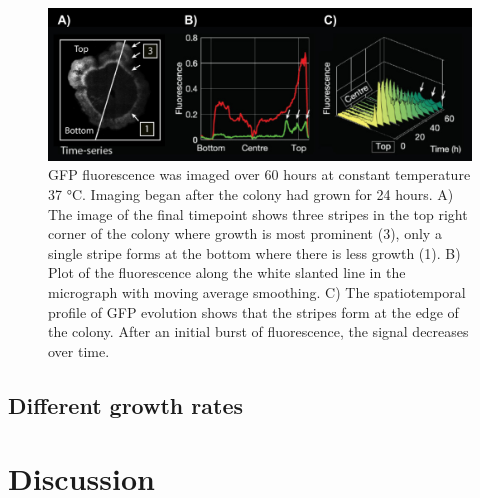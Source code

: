 \begin{figure}[H] %
    \centering
    \begin{adjustbox}{center}
        \includegraphics[width=1.1\textwidth]{chapters/Chapter 3/microscopy_timeseries} %
    \end{adjustbox}
    \caption{GFP fluorescence was imaged over 60 hours at constant temperature 37 °C. Imaging began after the colony had grown for 24 hours. A) The image of the final timepoint shows three stripes in the top right corner of the colony where growth is most prominent (3), only a single stripe forms at the bottom where there is less growth (1). B) Plot of the fluorescence along the white slanted line in the micrograph with moving average smoothing. C) The spatiotemporal profile of GFP evolution shows that the stripes form at the edge of the colony. After an initial burst of fluorescence, the signal decreases over time.}
    \label{fig:microscopy_timeseries}
\end{figure}

\subsection{Different growth rates}

\section{Discussion}


